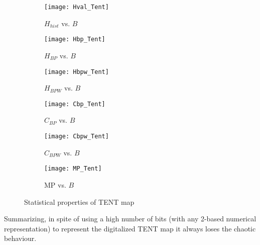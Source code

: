 \begin{figure}
	\centering
	\begin{subfigure}[b]{0.49\textwidth}
		\texttt{[image: Hval\_Tent]}
		\caption{$H_{hist}$ vs. $B$}
		\label{fig:Hval_Tent}
	\end{subfigure}
	\begin{subfigure}[b]{0.49\textwidth}
		\texttt{[image: Hbp\_Tent]}
		\caption{$H_{BP}$ vs. $B$}
		\label{fig:Hbp_Tent}
	\end{subfigure}
	\begin{subfigure}[b]{0.49\textwidth}
		\texttt{[image: Hbpw\_Tent]}
		\caption{$H_{BPW}$ vs. $B$}
		\label{fig:Hbpw_Tent}
	\end{subfigure}
	\begin{subfigure}[b]{0.49\textwidth}
		\texttt{[image: Cbp\_Tent]}
		\caption{$C_{BP}$ vs. $B$}
		\label{fig:Cbp_Tent}
	\end{subfigure}
	\begin{subfigure}[b]{0.49\textwidth}
		\texttt{[image: Cbpw\_Tent]}
		\caption{$C_{BPW}$ vs. $B$}
		\label{fig:Cbpw_Tent}
	\end{subfigure}
	\begin{subfigure}[b]{0.49\textwidth}
		\texttt{[image: MP\_Tent]}
		\caption{MP vs. $B$}
		\label{fig:MP_Tent}
	\end{subfigure}
	\caption{Statistical properties of TENT map}
	\label{fig:TENT_QuantiB}
\end{figure}

Summarizing, in spite of using a high number of bits (with any 2-based numerical representation) to represent the digitalized TENT map it always loses the chaotic behaviour.

